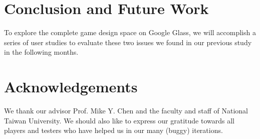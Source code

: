 \documentclass{sigchi}
\begin{document}

\section{Conclusion and Future Work}

To explore the complete game design space on Google Glass, we will accomplish a series of user studies to evaluate these two issues we found in our previous study in the following months. 


\section{Acknowledgements}
We thank our advisor Prof. Mike Y. Chen and the faculty and staff of National Taiwan University. We should also like to express our gratitude towards all players and testers who have helped us in our many (buggy) iterations.

\balance



\end{document}
